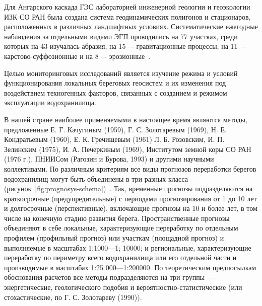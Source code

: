 \documentclass[732,14pt,final]{studrep}
\begin{document}
Для Ангарского каскада ГЭС лабораторией инженерной геологии и геоэкологии ИЗК СО РАН была создана система геодинамических полигонов и стационаров, расположенных в различных ландшафтных условиях. Систематические ежегодные наблюдения за отдельными видами ЭГП проводились на 77 участках, среди которых на 43 изучалась абразия, на 15 –- гравитационные процессы, на 11 –- карстово-суффозионные и на 8 –- эрозионные~\cite{koz18}.

Целью мониторинговых исследований является изучение режима и условий функционирования локальных береговых геосистем и их изменения под воздействием техногенных факторов, связанных с созданием и режимом эксплуатации водохранилища.

В нашей стране наиболее применяемыми в настоящее время являются методы, предложенные Е. Г. Качугиным (1959), Г. С. Золотаревым (1969), Н. Е. Кондратьевым (1960), Е. К. Гречищевым (1961) Л. Б. Розовским, И. П. Зелинским (1975), И. А. Печеркиным (1969), Институтом земной коры СО РАН (1976 г.), ПНИИСом (Рагозин и Бурова, 1993) и другими научными коллективами.
По различным критериям все виды прогнозов переработки берегов водохранилищ могут быть объединены в три разных класса (рисунок~\ref{fig:prognosys-schema})~\cite{ivanov01}. Так, временные прогнозы подразделяются на краткосрочные (предупредительные) с периодами прогнозирования от 1 до 10 лет и долгосрочные (перспективные), включающие прогнозы на 10 и более лет, в том числе на конечную стадию развития берега. Пространственные прогнозы объединяют в себе локальные, ха­рактеризующие переработку по отдельным профилем (профильный прогноз) или участкам (площадной прогноз) и выполняемые в масштабах 1:1000—1; 10000; и региональные, характеризующие переработку по периметру всего водохранилища или его отдель­ной части и производимые в масштабах 1:25 000—1:200000. По теоретическим предпосылкам обоснования расчетов все методы подразделяются на три группы — энергетические, геологического подобия и вероятностно-статистические (или стохастические, по Г. С. Золотареву (1990)).
\end{document}
